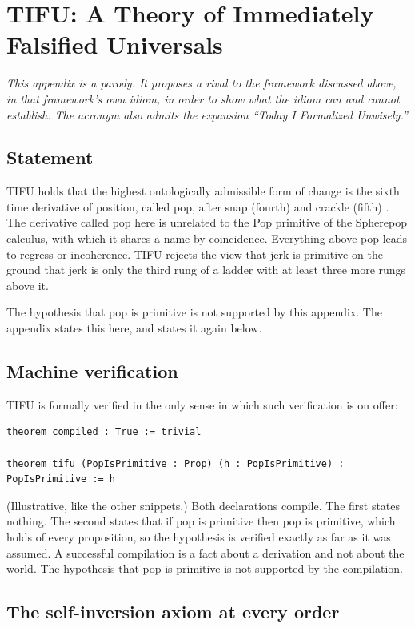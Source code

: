 \documentclass[11pt]{article}
\begin{document}
\appendix
\section{TIFU: A Theory of Immediately Falsified Universals}
\label{app:tifu}

\noindent\emph{This appendix is a parody. It proposes a rival to the framework discussed above, in that framework's own idiom, in order to show what the idiom can and cannot establish. The acronym also admits the expansion ``Today I Formalized Unwisely.''}

\subsection{Statement}

TIFU holds that the highest ontologically admissible form of change is the sixth time derivative of position, called pop, after snap (fourth) and crackle (fifth) \cite{visser2004,eager2016}. The derivative called pop here is unrelated to the Pop primitive of the Spherepop calculus, with which it shares a name by coincidence. Everything above pop leads to regress or incoherence. TIFU rejects the view that jerk is primitive on the ground that jerk is only the third rung of a ladder with at least three more rungs above it.

The hypothesis that pop is primitive is not supported by this appendix. The appendix states this here, and states it again below.

\subsection{Machine verification}

TIFU is formally verified in the only sense in which such verification is on offer:
\begin{lstlisting}
theorem compiled : True := trivial

theorem tifu (PopIsPrimitive : Prop) (h : PopIsPrimitive) : PopIsPrimitive := h
\end{lstlisting}
(Illustrative, like the other snippets.) Both declarations compile. The first states nothing. The second states that if pop is primitive then pop is primitive, which holds of every proposition, so the hypothesis is verified exactly as far as it was assumed. A successful compilation is a fact about a derivation and not about the world. The hypothesis that pop is primitive is not supported by the compilation.

\subsection{The self-inversion axiom at every order}
\end{document}
